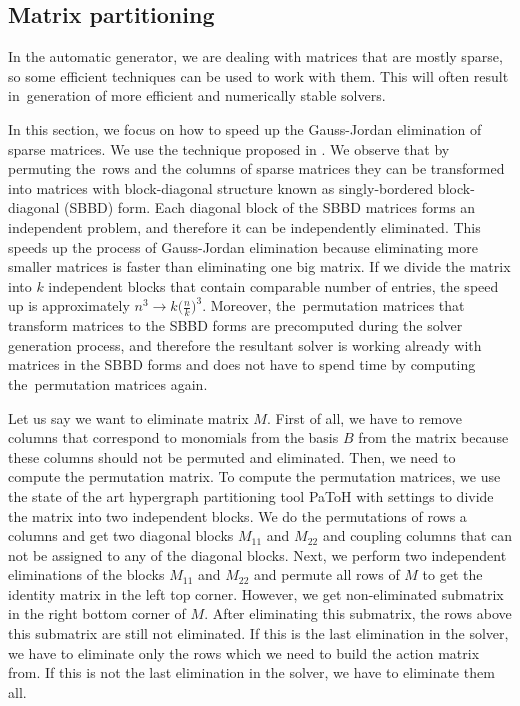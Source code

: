 \subsection{Matrix partitioning}
\label{subsec:matrixPart}
In the automatic generator, we are dealing with matrices that are mostly sparse, so some efficient techniques can be used to work with them. This will often result in~generation of more efficient and numerically stable solvers.

In this section, we focus on how to speed up the Gauss-Jordan elimination of sparse matrices. We use the technique proposed in \cite{SBBD}. We observe that by permuting the~rows and the columns of sparse matrices they can be transformed into matrices with block-diagonal structure known as singly-bordered block-diagonal (SBBD) form. Each diagonal block of the SBBD matrices forms an independent problem, and therefore it can be independently eliminated. This speeds up the process of Gauss-Jordan elimination because eliminating more smaller matrices is faster than eliminating one big matrix. If we divide the matrix into $k$ independent blocks that contain comparable number of entries, the speed up is approximately $n^3 \rightarrow k\big(\frac{n}{k}\big)^3$. Moreover, the~permutation matrices that transform matrices to the SBBD forms are precomputed during the solver generation process, and therefore the resultant solver is working already with matrices in the SBBD forms and does not have to spend time by computing the~permutation matrices again.

Let us say we want to eliminate matrix $M$. First of all, we have to remove columns that correspond to monomials from the basis $B$ from the matrix because these columns should not be permuted and eliminated. Then, we need to compute the permutation matrix. To compute the permutation matrices, we use the state of the art hypergraph partitioning tool PaToH \cite{PaToH} with settings to divide the matrix into two independent blocks. We do the permutations of rows a columns and get two diagonal blocks $M_{11}$ and $M_{22}$ and coupling columns that can not be assigned to any of the diagonal blocks. Next, we perform two independent eliminations of the blocks $M_{11}$ and $M_{22}$ and permute all rows of $M$ to get the identity matrix in the left top corner. However, we get non-eliminated submatrix in the right bottom corner of $M$. After eliminating this submatrix, the rows above this submatrix are still not eliminated. If this is the last elimination in the solver, we have to eliminate only the rows which we need to build the action matrix from. If this is not the last elimination in the solver, we have to eliminate them all.

